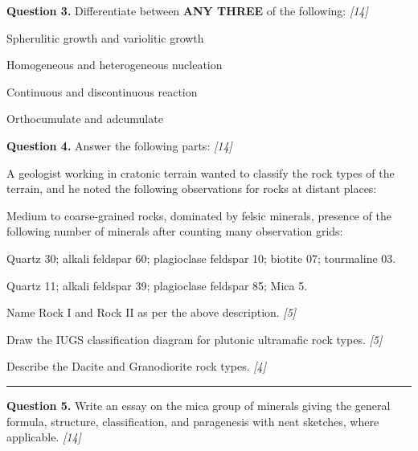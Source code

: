 \documentclass[11pt,a4paper]{article}
\newcommand{\pts}[1]{\hfill   \textit{[#1]}}
\begin{document}
\noindent   \textbf{Question 3.} Differentiate between   \textbf{ANY THREE} of the following: \pts{14}

\begin{parts}
  \item Spherulitic growth and variolitic growth
  \item Homogeneous and heterogeneous nucleation
  \item Continuous and discontinuous reaction
  \item Orthocumulate and adcumulate
\end{parts}

\medskip


\noindent   \textbf{Question 4.} Answer the following parts: \pts{14}

\begin{parts}
  \item A geologist working in cratonic terrain wanted to classify the rock types of the terrain, and he noted the following observations for rocks at distant places:
  
  Medium to coarse-grained rocks, dominated by felsic minerals, presence of the following number of minerals after counting many observation grids:
  
\begin{subparts}
    \item Quartz 30; alkali feldspar 60; plagioclase feldspar 10; biotite 07; tourmaline 03.
    \item Quartz 11; alkali feldspar 39; plagioclase feldspar 85; Mica 5.
  \end{subparts}
  Name Rock I and Rock II as per the above description. \pts{5}
  
  \item Draw the IUGS classification diagram for plutonic ultramafic rock types. \pts{5}
  
  \item Describe the Dacite and Granodiorite rock types. \pts{4}
\end{parts}

\bigskip


\rule{\linewidth}{0.4pt}\smallskip




\noindent   \textbf{Question 5.} Write an essay on the mica group of minerals giving the general formula, structure, classification, and paragenesis with neat sketches, where applicable. \pts{14}

\medskip
\end{document}
